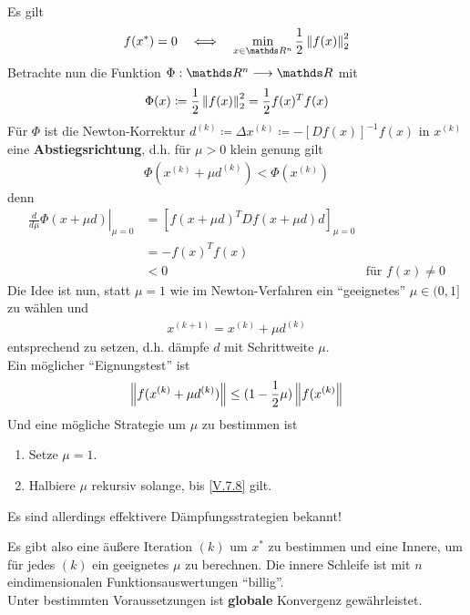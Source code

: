 Es gilt
\begin{gather}
f(x^{*}) = 0 \quad \Longleftrightarrow \quad 
\min_{x\in\Ren} \frac{1}{2} \nn{f(x)}_2^2
\label{V.7.5}
\end{gather}
Betrachte nun die Funktion $\Phi: \Ren\longrightarrow \R$ mit 
\begin{gather*}
\Phi (x) \coloneqq \frac{1}{2} \left\| f(x) \right\|_2^2 
= \frac{1}{2} f(x)^T f(x)
\end{gather*}
Für $\Phi$ ist die Newton-Korrektur
$d^{(k)} \coloneqq \Delta x^{(k)} \coloneqq -[Df(x)]^{-1}f(x)$
in $x^{(k)} $ eine \textbf{Abstiegsrichtung},
d.h. für $\mu >0 $ klein genung gilt
\begin{gather}
\Phi(x^{(k)}+\mu d^{(k)}) < \Phi(x^{(k)} )
\label{V.7.6}
\end{gather}
denn 
\begin{align*}
\left.\frac{d}{d\mu} \Phi(x+\mu d)\right\vert_{\mu = 0} 
&= \left[f(x+\mu d)^TDf(x+\mu d)d\right]_{\mu = 0}\\
&= -f(x)^Tf(x) \\
&< 0 & \text{für } f(x)\neq 0
\end{align*}
Die Idee ist nun, statt $\mu = 1$ wie im Newton-Verfahren
ein \enquote{geeignetes} $\mu \in (0,1]$ zu wählen und 
\begin{gather}
x^{(k+1)} = x^{(k)} +\mu d^{(k)}
\label{V.7.7}
\end{gather}
entsprechend zu setzen, d.h. dämpfe $d$ mit Schrittweite $\mu$.\\
Ein möglicher \enquote{Eignungstest} ist
\begin{gather}
\left\| f(x^{(k)}+\mu d^{(k)}) \right\|
\leq (1-\frac{1}{2}\mu )\left\| f(x^{(k)} \right\|
\label{V.7.8}
\end{gather}
Und eine mögliche Strategie um $\mu $ zu bestimmen ist 
\begin{enumerate}[1.]
	\item Setze $\mu=1$.
	\item Halbiere $\mu$ rekursiv solange, bis \eqref{V.7.8} gilt.
\end{enumerate}
Es sind allerdings effektivere Dämpfungsstrategien bekannt!

Es gibt also eine äußere Iteration $(k)$
um $x^{*}$ zu bestimmen
und eine Innere, um für jedes $(k)$
ein geeignetes $\mu$ zu berechnen.
Die innere Schleife ist mit $n$ eindimensionalen Funktionsauswertungen
\enquote{billig}. \\
Unter bestimmten Voraussetzungen ist
\textbf{globale} Konvergenz gewährleistet.
